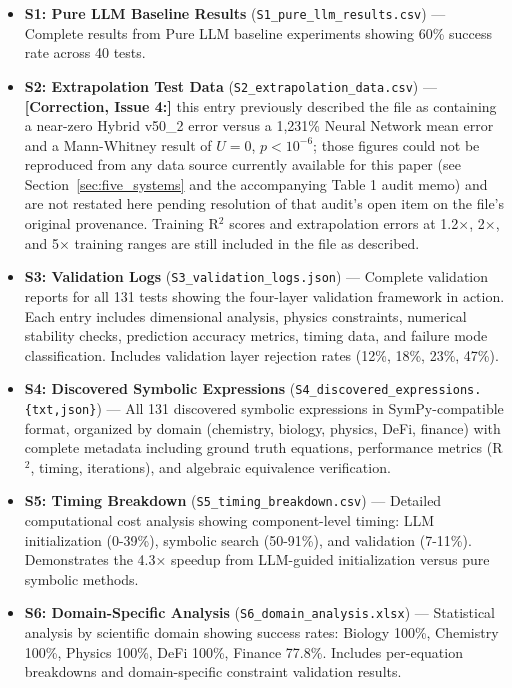 \documentclass[twoside,11pt]{article}
\begin{document}
\begin{itemize}
\item \textbf{S1: Pure LLM Baseline Results} (\texttt{S1\_pure\_llm\_results.csv}) --- Complete results from Pure LLM baseline experiments showing 60\% success rate across 40 tests.

\item \textbf{S2: Extrapolation Test Data} (\texttt{S2\_extra\-polation\_data.csv}) --- \textbf{[Correction, Issue 4:]} this entry previously described the file as containing a near-zero Hybrid v50\_2 error versus a 1{,}231\% Neural Network mean error and a Mann-Whitney result of $U=0$, $p<10^{-6}$; those figures could not be reproduced from any data source currently available for this paper (see Section~\ref{sec:five_systems} and the accompanying Table 1 audit memo) and are not restated here pending resolution of that audit's open item on the file's original provenance. Training R$^2$ scores and extrapolation errors at 1.2$\times$, 2$\times$, and 5$\times$ training ranges are still included in the file as described.

\item \textbf{S3: Validation Logs} (\texttt{S3\_validation\_logs.json}) --- Complete validation reports for all 131 tests showing the four-layer validation framework in action. Each entry includes dimensional analysis, physics constraints, numerical stability checks, prediction accuracy metrics, timing data, and failure mode classification. Includes validation layer rejection rates (12\%, 18\%, 23\%, 47\%).

\item \textbf{S4: Discovered Symbolic Expressions} (\texttt{S4\_discovered\_expressions.\{txt,json\}}) --- All 131 discovered symbolic expressions in SymPy-compatible format, organized by domain (chemistry, biology, physics, DeFi, finance) with complete metadata including ground truth equations, performance metrics (R$^2$, timing, iterations), and algebraic equivalence verification.

\item \textbf{S5: Timing Breakdown} (\texttt{S5\_timing\_breakdown.csv}) --- Detailed computational cost analysis showing component-level timing: LLM initialization (0-39\%), symbolic search (50-91\%), and validation (7-11\%). Demonstrates the 4.3× speedup from LLM-guided initialization versus pure symbolic methods.

\item \textbf{S6: Domain-Specific Analysis} (\texttt{S6\_domain\_analysis.xlsx}) --- Statistical analysis by scientific domain showing success rates: Biology 100\%, Chemistry 100\%, Physics 100\%, DeFi 100\%, Finance 77.8\%. Includes per-equation breakdowns and domain-specific constraint validation results.


\end{itemize}
\end{document}
